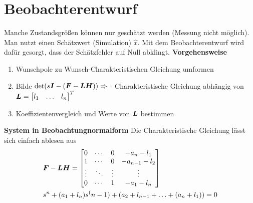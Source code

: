 \section{Beobachterentwurf}

\begin{tcolorbox}[colback=white!10!white,colframe=green!30!black] 
	Manche Zustandsgrößen können nur geschätzt werden (Messung nicht möglich). Man nutzt einen Schätzwert (Simulation) $\hat{x}$. Mit dem Beobachterentwurf wird dafür gesorgt, dass der Schätzfehler auf Null abklingt.
		\textbf{Vorgehensweise}
		\begin{enumerate}
			\item Wunschpole zu Wunsch-Charakteristischen Gleichung umformen
			\item Bilde $\det(s\boldsymbol{I}-(\boldsymbol{F}-\boldsymbol{LH}))\Rightarrow$ - Charakteristische Gleichung abhängig von $\boldsymbol{L} = \begin{bmatrix}
			l_1&\ldots&l_n
			\end{bmatrix}^T$ 
			\item Koeffizientenvergleich und Werte von $\boldsymbol{L}$ bestimmen
		\end{enumerate}
	\tcblower
\textbf{System in Beobachtungnormalform}
Die Charakteristische Gleichung lässt sich einfach ablesen aus
\begin{align*}
	&\boldsymbol{F}-\boldsymbol{LH} = 
	\begin{bmatrix}
	0 &  \cdots & 0 &-a_n-l_1\\
	1 &\cdots & 0 & -a_{n-1}-l_2 \\
	\vdots&\ddots&\vdots&\vdots\\
	0&\cdots&1&-a_1-l_n
	\end{bmatrix}	\\
	&s^n +(a_1+l_n)s^(n-1)+ (a_2+l_{n-1}+\ldots+(a_n+l_1))=0
\end{align*}


\end{tcolorbox}